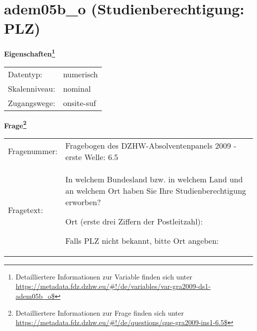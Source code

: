 
    \setcounter{footnote}{0}

    \vspace*{-1.8cm}
	\section{adem05b\_o (Studienberechtigung: PLZ)}
	\label{section:adem05b_o}



    \vspace*{0.5cm}
    \noindent\textbf{Eigenschaften\footnote{Detailliertere Informationen zur Variable finden sich unter
		\url{https://metadata.fdz.dzhw.eu/\#!/de/variables/var-gra2009-ds1-adem05b_o$}}}\\
	\begin{tabularx}{\hsize}{@{}lX}
	Datentyp: & numerisch \\
	Skalenniveau: & nominal \\
	Zugangswege: &
	  onsite-suf
 \\
    \end{tabularx}



				\vspace*{0.5cm}
                \noindent\textbf{Frage\footnote{Detailliertere Informationen zur Frage finden sich unter
		              \url{https://metadata.fdz.dzhw.eu/\#!/de/questions/que-gra2009-ins1-6.5$}}}\\
				\begin{tabularx}{\hsize}{@{}lX}
					Fragenummer: &
					  Fragebogen des DZHW-Absolventenpanels 2009 - erste Welle:
					  6.5
 \\
					Fragetext: & In welchem Bundesland bzw. in welchem Land und an welchem Ort haben Sie Ihre Studienberechtigung erworben?\par  Ort (erste drei Ziffern der Postleitzahl):\par  Falls PLZ nicht bekannt, bitte Ort angeben: \\
				\end{tabularx}





